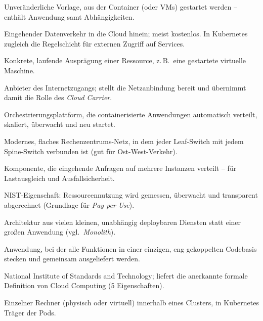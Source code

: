 \begin{glossar}
  \item[Image] Unveränderliche Vorlage, aus der Container (oder VMs) gestartet
        werden -- enthält Anwendung samt Abhängigkeiten.

  \item[Ingress] Eingehender Datenverkehr in die Cloud hinein; meist kostenlos.
        In Kubernetes zugleich die Regelschicht für externen Zugriff auf Services.

  \item[Instanz] Konkrete, laufende Ausprägung einer Ressource, z.\,B.\ eine
        gestartete virtuelle Maschine.

  \item[ISP (Internet Service Provider)] Anbieter des Internetzugangs; stellt die
        Netzanbindung bereit und übernimmt damit die Rolle des \emph{Cloud Carrier}.

  \item[Kubernetes] Orchestrierungsplattform, die containerisierte Anwendungen
        automatisch verteilt, skaliert, überwacht und neu startet.

  \item[Leaf-Spine-Architektur] Modernes, flaches Rechenzentrums-Netz, in dem
        jeder Leaf-Switch mit jedem Spine-Switch verbunden ist (gut für Ost-West-Verkehr).

  \item[Load Balancer] Komponente, die eingehende Anfragen auf mehrere Instanzen
        verteilt -- für Lastausgleich und Ausfallsicherheit.

  \item[Measured Service] NIST-Eigenschaft: Ressourcennutzung wird gemessen,
        überwacht und transparent abgerechnet (Grundlage für \emph{Pay per Use}).

  \item[Microservices] Architektur aus vielen kleinen, unabhängig
        deploybaren Diensten statt einer großen Anwendung (vgl.\ \emph{Monolith}).

  \item[Monolith] Anwendung, bei der alle Funktionen in einer einzigen,
        eng gekoppelten Codebasis stecken und gemeinsam ausgeliefert werden.

  \item[NIST] National Institute of Standards and Technology; liefert die
        anerkannte formale Definition von Cloud Computing (5 Eigenschaften).

  \item[Node] Einzelner Rechner (physisch oder virtuell) innerhalb eines Clusters,
        in Kubernetes Träger der Pods.


\end{glossar}

